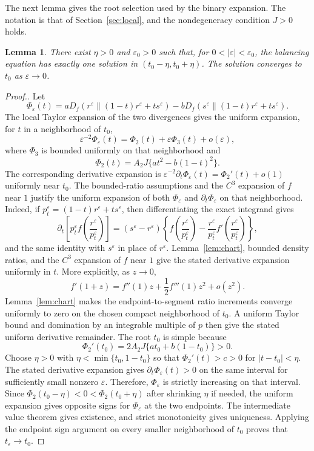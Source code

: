 \documentclass[11pt]{article}
\theoremstyle{plain}
\newtheorem{lemma}[theorem]{Lemma}
\theoremstyle{definition}
\theoremstyle{definition}
\newcommand{\eps}{\varepsilon}
\begin{document}
The next lemma gives the root selection used by the binary expansion. The notation is that of Section~\ref{sec:local}, and the nondegeneracy condition $J>0$ holds.

\begin{lemma}\label{lem:root}
There exist $\eta>0$ and $\eps_0>0$ such that, for $0<|\eps|<\eps_0$, the balancing equation has exactly one solution in $(t_0-\eta,t_0+\eta)$. The solution converges to $t_0$ as $\eps\to0$.
\end{lemma}

\begin{proof}[Proof.]
Let
\[
\Phi_\eps(t)=aD_f(r^\eps\|(1-t)r^\eps+ts^\eps)-bD_f(s^\eps\|(1-t)r^\eps+ts^\eps).
\]
The local Taylor expansion of the two divergences gives the uniform expansion, for $t$ in a neighborhood of $t_0$,
\[
\eps^{-2}\Phi_\eps(t)= \Phi_2(t)+\eps\Phi_3(t)+o(\eps),
\]
where $\Phi_3$ is bounded uniformly on that neighborhood and
\[
\Phi_2(t)=A_2J\{at^2-b(1-t)^2\}.
\]
The corresponding derivative expansion is
$\eps^{-2}\partial_t\Phi_\eps(t)= \Phi_2'(t)+o(1)$
uniformly near $t_0$. The bounded-ratio assumptions and the $C^3$ expansion of $f$ near $1$ justify the uniform expansion of both $\Phi_\eps$ and $\partial_t\Phi_\eps$ on that neighborhood. Indeed, if $p_t^\eps=(1-t)r^\eps+ts^\eps$, then differentiating the exact integrand gives
\[
\partial_t\left[p_t^\eps f\left(\frac{r^\eps}{p_t^\eps}\right)\right]
=(s^\eps-r^\eps)\left\{f\left(\frac{r^\eps}{p_t^\eps}\right)
-\frac{r^\eps}{p_t^\eps}f'\left(\frac{r^\eps}{p_t^\eps}\right)\right\},
\]
and the same identity with $s^\eps$ in place of $r^\eps$. Lemma~\ref{lem:chart}, bounded density ratios, and the $C^3$ expansion of $f$ near $1$ give the stated derivative expansion uniformly in $t$.
More explicitly, as $z\to0$,
\[
f'(1+z)=f''(1)z+\frac12f'''(1)z^2+o(z^2).
\]
Lemma~\ref{lem:chart} makes the endpoint-to-segment ratio increments converge uniformly to zero on the chosen compact neighborhood of $t_0$. A uniform Taylor bound and domination by an integrable multiple of $p$ then give the stated uniform derivative remainder.
The root $t_0$ is simple because
\[
\Phi_2'(t_0)=2A_2J\{at_0+b(1-t_0)\}>0.
\]
Choose $\eta>0$ with $\eta<\min\{t_0,1-t_0\}$ so that $\Phi_2'(t)>c>0$ for $|t-t_0|<\eta$. The stated derivative expansion gives $\partial_t\Phi_\eps(t)>0$ on the same interval for sufficiently small nonzero $\eps$. Therefore, $\Phi_\eps$ is strictly increasing on that interval. Since $\Phi_2(t_0-\eta)<0<\Phi_2(t_0+\eta)$ after shrinking $\eta$ if needed, the uniform expansion gives opposite signs for $\Phi_\eps$ at the two endpoints. The intermediate value theorem gives existence, and strict monotonicity gives uniqueness. Applying the endpoint sign argument on every smaller neighborhood of $t_0$ proves that $t_\eps\to t_0$.
\end{proof}
\end{document}
